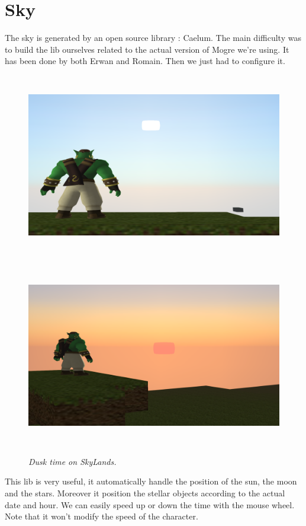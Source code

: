 \documentclass[article]{report} %
\begin{document}
			\section{Sky}
				The sky is generated by an open source library : Caelum. The main difficulty was to build the lib ourselves related to the actual version of \ac{Mogre} we're using. It has been done by both Erwan and Romain. Then we just had to configure it.\\

			\begin{figure}[h]
				\includegraphics[width=15cm, height=8cm]{Images/Screenshot/BackPerso-Sun.png}
\begin{center}\it \end{center}
				\includegraphics[width=15cm, height=8cm]{Images/Screenshot/SunSet01.png}
				\begin{center}\it Dusk time on SkyLands. \end{center}
			\end{figure}
This lib is very useful, it automatically handle the position of the sun, the moon and the stars. Moreover it position the stellar objects according to the actual date and hour. We can easily speed up or down the time with the mouse wheel. Note that it won't modify the speed of the character.
\newpage
\end{document}
